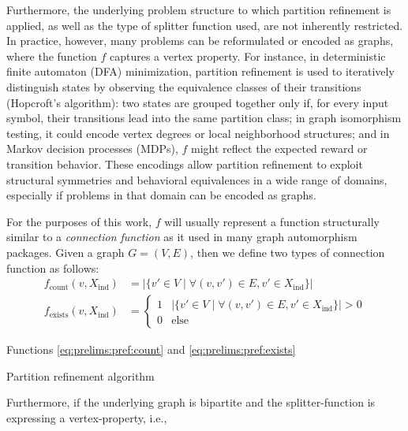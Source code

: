 		Furthermore, the underlying problem structure to which partition refinement is applied, as well as the type of splitter function used, are not inherently restricted. In practice, however, many problems can be reformulated or encoded as graphs, where the function $f$ captures a vertex property.
		For instance, in deterministic finite automaton (DFA) minimization, partition refinement is used to iteratively distinguish states by observing the equivalence classes of their transitions (Hopcroft's algorithm): two states are grouped together only if, for every input symbol, their transitions lead into the same partition class; in graph isomorphism testing, it could encode vertex degrees or local neighborhood structures; and in Markov decision processes (MDPs), $f$ might reflect the expected reward or transition behavior.
		These encodings allow partition refinement to exploit structural symmetries and behavioral equivalences in a wide range of domains, especially if problems in that domain can be encoded as graphs.
		
		For the purposes of this work, $f$ will usually represent a function structurally similar to a \textit{connection function} as it used in many graph automorphism packages.
		Given a graph $G = (V, E)$, then we define two types of connection function as follows:
		\begin{align}
			f_{\mathrm{count}}(v, X_{\mathrm{ind}}) &= \left| \{ v' \in V \mid \forall (v, v') \in E, v' \in X_{\mathrm{ind}} \} \right| \label{eq:prelims:pref:count} \\
			f_{\mathrm{exists}}(v, X_{\mathrm{ind}}) &= \begin{cases}
				1 & \left| \{ v' \in V \mid \forall (v, v') \in E, v' \in X_{\mathrm{ind}}   \} \right| > 0 \label{eq:prelims:pref:exists} \\
				0 & \mathrm{else}
			\end{cases}
		\end{align}
		
		Functions \ref{eq:prelims:pref:count} and \ref{eq:prelims:pref:exists}
		
		\begin{algorithm}[ht!]
			\centering
			\begin{algorithmic}
				\EndWhile
			\end{algorithmic}
			\caption{Partition refinement algorithm}
			\label{algo:prelims:refinement}
		\end{algorithm}
	
		Furthermore, if the underlying graph is bipartite and the splitter-function is expressing a vertex-property, i.e., 
	
